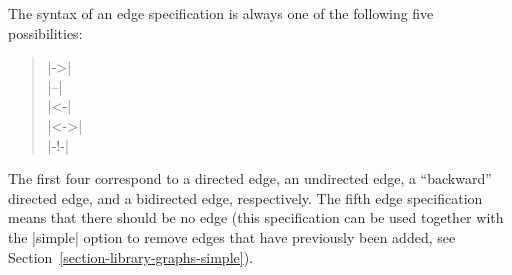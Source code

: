 The syntax of an edge specification is always one of the following five
possibilities:
%
\begin{quote}
    |->| \\
    |--| \\
    |<-| \\
    |<->| \\
    |-!-| 
\end{quote}

The first four correspond to a directed edge, an undirected edge, a
``backward'' directed edge, and a bidirected edge, respectively. The fifth edge
specification means that there should be no edge (this specification can be
used together with the |simple| option to remove edges that have previously
been added, see Section~\ref{section-library-graphs-simple}).

